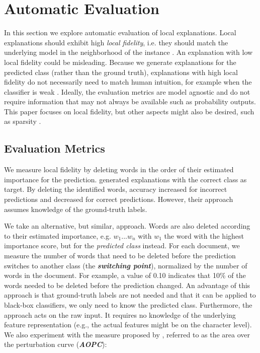 \documentclass[11pt,a4paper]{article}
\begin{document}
\section{Automatic Evaluation}
\label{automatic_evaluation}
In this section we explore automatic evaluation of local explanations. Local explanations should exhibit high \emph{local fidelity}, i.e. they should match the underlying model in the neighborhood of the instance \cite{Ribeiro:2016:WIT:2939672.2939778}. An explanation with low local fidelity could be misleading. Because we generate explanations for the predicted class (rather than the ground truth), 
explanations with high local fidelity do not necessarily need to match human intuition, for example when the classifier is weak \cite{DBLP:journals/corr/SamekBMBM15}. Ideally, the evaluation metrics are model agnostic and do not require  information that may not always be available such as probability outputs.
This paper focuses on local fidelity, but other aspects might also be desired, such as sparsity  \cite{DBLP:journals/corr/SamekBMBM15,Ribeiro:2016:WIT:2939672.2939778,Martens:2014:EDD:2600518.2600523}.


\subsection{Evaluation Metrics} 
We measure local fidelity by deleting  words in the order of their estimated importance for the prediction. \citet{arras2016explaining}  generated explanations with the correct class as target. By deleting the identified words, accuracy increased for incorrect predictions and decreased for correct predictions. However, their approach assumes knowledge of the ground-truth labels.

We take an alternative, but similar, approach. Words are also deleted according to their estimated importance, e.g. $w_1...w_n$ with $w_1$ the word with the highest importance score, but for the \textit{predicted class} instead. For each document, we measure the number of  words that  need to be deleted before the prediction switches to another class (the \textit{\textbf{switching point}}), normalized by the number of words in the document. For example, a value of 0.10 indicates that 10\% of the words needed to be deleted before the prediction changed. An advantage of this approach is that ground-truth labels are not needed and that it can be applied to black-box classifiers, we only need to know the predicted class. Furthermore, the approach acts on the raw input. It  requires no knowledge of the underlying feature representation (e.g., the actual features might be on the character level).  
We also experiment with the measure proposed by \citet{DBLP:journals/corr/SamekBMBM15},
referred to as the area over the perturbation curve (\emph{\textbf{AOPC}}):
\end{document}
